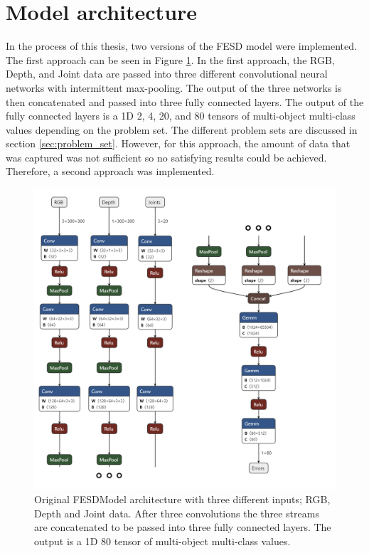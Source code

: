 \section{Model architecture}
\label{sec:model_architecture}

In the process of this thesis, two versions of the FESD model were implemented. The first approach can be seen in Figure \ref{fig:model_architecture_v1}. In the first approach, the RGB, Depth, and Joint data are passed into three different convolutional neural networks with intermittent max-pooling. The output of the three networks is then concatenated and passed into three fully connected layers. The output of the fully connected layers is a 1D 2, 4, 20, and 80 tensors of multi-object multi-class values depending on the problem set. The different problem sets are discussed in section \ref{sec:problem_set}. However, for this approach, the amount of data that was captured was not sufficient so no satisfying results could be achieved. Therefore, a second approach was implemented.

\begin{figure}[h]
  \centering
  \includegraphics[width=\linewidth]{figures/Model/FESD.png}
  \caption[FESDModel architecture version 1]{Original FESDModel architecture with three different inputs; RGB, Depth and Joint data. After three convolutions the three streams are concatenated to be passed into three fully connected layers. The output is a 1D 80 tensor of multi-object multi-class values.}
  \label{fig:model_architecture_v1}
\end{figure}

